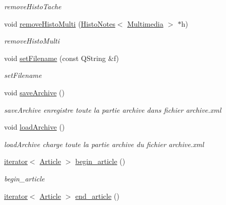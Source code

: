 \begin{DoxyCompactItemize}
\begin{DoxyCompactList}\small\item\em remove\+Histo\+Tache \end{DoxyCompactList}\item 
void \hyperlink{class_archive_a48f5668209fabeefa9704ba44f9d1fc6}{remove\+Histo\+Multi} (\hyperlink{class_histo_notes}{Histo\+Notes}$<$ \hyperlink{class_multimedia}{Multimedia} $>$ $\ast$h)
\begin{DoxyCompactList}\small\item\em remove\+Histo\+Multi \end{DoxyCompactList}\item 
void \hyperlink{class_archive_a1410df8130f684c1386fea1a3d2fec5d}{set\+Filename} (const Q\+String \&f)
\begin{DoxyCompactList}\small\item\em set\+Filename \end{DoxyCompactList}\item 
\mbox{\label{class_archive_a5333df9cbd002721911230e31784bb50}} 
void \hyperlink{class_archive_a5333df9cbd002721911230e31784bb50}{save\+Archive} ()
\begin{DoxyCompactList}\small\item\em save\+Archive enregistre toute la partie archive dans fichier archive.\+xml \end{DoxyCompactList}\item 
\mbox{\label{class_archive_a6e3dc2b34678089685bde4b68a7bb955}} 
void \hyperlink{class_archive_a6e3dc2b34678089685bde4b68a7bb955}{load\+Archive} ()
\begin{DoxyCompactList}\small\item\em load\+Archive charge toute la partie archive du fichier archive.\+xml \end{DoxyCompactList}\item 
\hyperlink{class_archive_1_1iterator}{iterator}$<$ \hyperlink{class_article}{Article} $>$ \hyperlink{class_archive_a0b6bb8f4560874f757a4fdb3cd5bea7d}{begin\+\_\+article} ()
\begin{DoxyCompactList}\small\item\em begin\+\_\+article \end{DoxyCompactList}\item 
\hyperlink{class_archive_1_1iterator}{iterator}$<$ \hyperlink{class_article}{Article} $>$ \hyperlink{class_archive_a06f4dca9905c8384f34005850a762b7d}{end\+\_\+article} ()

\end{DoxyCompactItemize}
